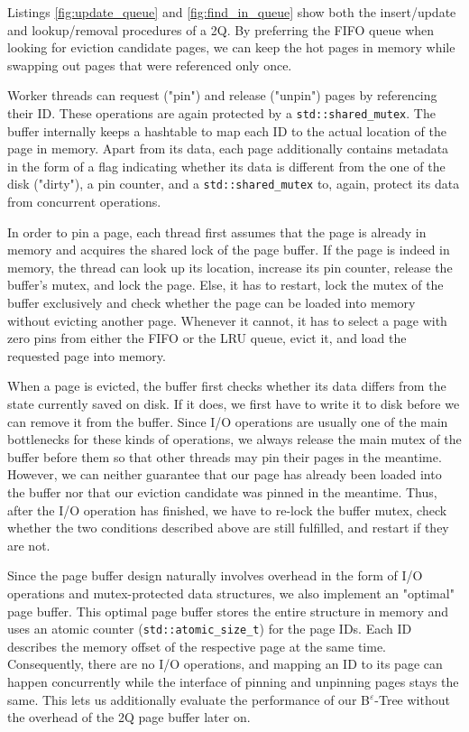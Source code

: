 Listings \ref{fig:update_queue} and \ref{fig:find_in_queue} show both the insert/update and lookup/removal procedures of a 2Q. By preferring the FIFO queue when looking for eviction candidate pages, we can keep the hot pages in memory while swapping out pages that were referenced only once. \cite{source_2Q}

Worker threads can request ("pin") and release ("unpin") pages by referencing their ID. These operations are again protected by a \texttt{std::shared\_mutex}. The buffer internally keeps a hashtable to map each ID to the actual location of the page in memory. Apart from its data, each page additionally contains metadata in the form of a flag indicating whether its data is different from the one of the disk ("dirty"), a pin counter, and a \texttt{std::shared\_mutex} to, again, protect its data from concurrent operations.

In order to pin a page, each thread first assumes that the page is already in memory and acquires the shared lock of the page buffer. If the page is indeed in memory, the thread can look up its location, increase its pin counter, release the buffer's mutex, and lock the page. Else, it has to restart, lock the mutex of the buffer exclusively and check whether the page can be loaded into memory without evicting another page. Whenever it cannot, it has to select a page with zero pins from either the FIFO or the LRU queue, evict it, and load the requested page into memory.

When a page is evicted, the buffer first checks whether its data differs from the state currently saved on disk. If it does, we first have to write it to disk before we can remove it from the buffer. Since I/O operations are usually one of the main bottlenecks for these kinds of operations, we always release the main mutex of the buffer before them so that other threads may pin their pages in the meantime. However, we can neither guarantee that our page has already been loaded into the buffer nor that our eviction candidate was pinned in the meantime. Thus, after the I/O operation has finished, we have to re-lock the buffer mutex, check whether the two conditions described above are still fulfilled, and restart if they are not.

Since the page buffer design naturally involves overhead in the form of I/O operations and mutex-protected data structures, we also implement an "optimal" page buffer. This optimal page buffer stores the entire structure in memory and uses an atomic counter (\texttt{std::atomic\_size\_t}) for the page IDs. Each ID describes the memory offset of the respective page at the same time. Consequently, there are no I/O operations, and mapping an ID to its page can happen concurrently while the interface of pinning and unpinning pages stays the same. This lets us additionally evaluate the performance of our B$^\varepsilon$-Tree without the overhead of the 2Q page buffer later on.

